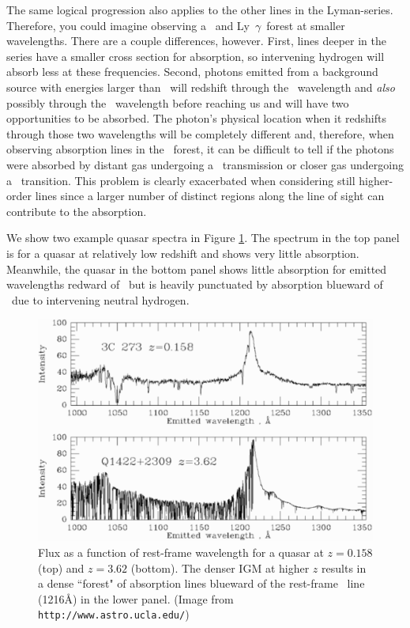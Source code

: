 The same logical progression also applies to the other lines in the Lyman-series. Therefore, you could imagine observing a \lyb\ and Ly\ $\gamma$\ forest at smaller wavelengths. There are a couple differences, however. First, lines deeper in the series have a smaller cross section for absorption, so intervening hydrogen will absorb less at these frequencies. Second, photons emitted from a background source with energies larger than \lyb\ will redshift through the \lyb\ wavelength and \textit{also} possibly through the \lya\ wavelength before reaching us and will have two opportunities to be absorbed. The photon's physical location when it redshifts through those two wavelengths will be completely different and, therefore, when observing absorption lines in the \lyb\ forest, it can be difficult to tell if the photons were absorbed by distant gas undergoing a \lyb\ transmission or closer gas undergoing a \lya\ transition. This problem is clearly exacerbated when considering still higher-order lines since a larger number of distinct regions along the line of sight can contribute to the absorption.


We show two example quasar spectra in Figure \ref{fig:LyaExample}. The spectrum in the top panel is for a quasar at relatively low redshift and shows very little absorption. Meanwhile, the quasar in the bottom panel shows little absorption for emitted wavelengths redward of \lya\ but is heavily punctuated by absorption blueward of \lya\ due to intervening neutral hydrogen.
 
\begin{figure}[!p]
  \centering
  \includegraphics[width=12cm]{Lya-forest-60.eps}
  \caption{Flux as a function of rest-frame wavelength for a quasar at $z = 0.158$ (top) and $z = 3.62$ (bottom). The denser IGM at higher $z$ results in a dense ``forest" of absorption lines blueward of the rest-frame \lya\ line (1216\AA) in the lower panel. (Image from {\tt http://www.astro.ucla.edu/})}
  \label{fig:LyaExample}
\end{figure}

